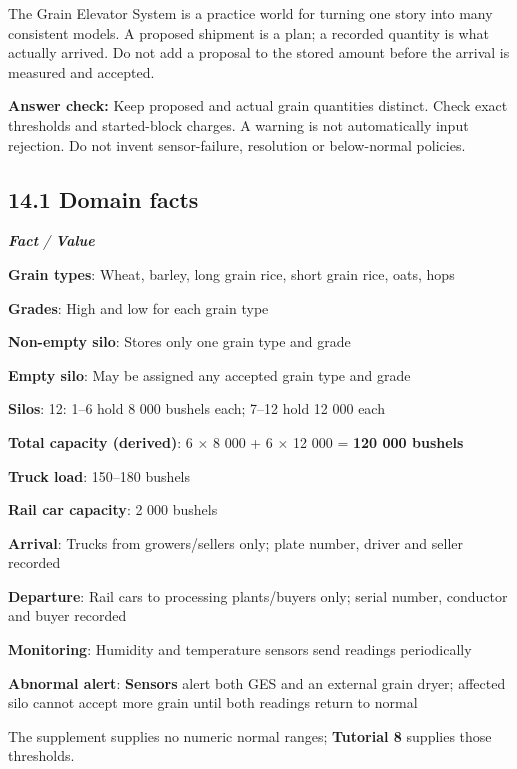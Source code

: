 

\begin{studycolumns}
\vspace{0pt}
\begin{eli5box}
The Grain Elevator System is a practice world for turning one story into many consistent models. A proposed shipment is a plan; a recorded quantity is what actually arrived. Do not add a proposal to the stored amount before the arrival is measured and accepted.
\end{eli5box}
\textbf{Answer check:} Keep proposed and actual grain quantities distinct. Check exact thresholds and started-block charges. A warning is not automatically input rejection. Do not invent sensor-failure, resolution or below-normal policies.


\subsection*{14.1 Domain facts}

\begin{referenceentries}
\textit{\textbf{Fact} / \textbf{Value}}\par\smallskip
\noindent \textbf{Grain types}: Wheat, barley, long grain rice, short grain rice, oats, hops\par
\noindent \textbf{Grades}: High and low for each grain type\par
\noindent \textbf{Non-empty silo}: Stores only one grain type and grade\par
\noindent \textbf{Empty silo}: May be assigned any accepted grain type and grade\par
\noindent \textbf{Silos}: 12: 1--6 hold 8 000 bushels each; 7--12 hold 12 000 each\par
\noindent \textbf{Total capacity (derived)}: 6 \ensuremath{\times} 8 000 + 6 \ensuremath{\times} 12 000 = \textbf{120 000 bushels}\par
\noindent \textbf{Truck load}: 150--180 bushels\par
\noindent \textbf{Rail car capacity}: 2 000 bushels\par
\noindent \textbf{Arrival}: Trucks from growers/\allowbreak{}sellers only; plate number, driver and seller recorded\par
\noindent \textbf{Departure}: Rail cars to processing plants/\allowbreak{}buyers only; serial number, conductor and buyer recorded\par
\noindent \textbf{Monitoring}: Humidity and temperature sensors send readings periodically\par
\noindent \textbf{Abnormal alert}: \textbf{Sensors} alert both GES and an external grain dryer; affected silo cannot accept more grain until both readings return to normal\par
\end{referenceentries}
The supplement supplies no numeric normal ranges; \textbf{Tutorial 8} supplies those thresholds.



\end{studycolumns}

